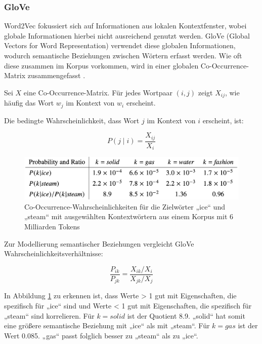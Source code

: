 \subsubsection{GloVe}

Word2Vec fokussiert sich auf Informationen aus lokalen Kontextfenster, wobei globale Informationen hierbei nicht ausreichend genutzt werden.
GloVe (Global Vectors for Word Representation) verwendet diese globalen Informationen, wodurch semantische Beziehungen zwischen Wörtern erfasst werden.
Wie oft diese zusammen im Korpus vorkommen, wird in einer globalen Co-Occurrence-Matrix zusammengefasst \cite{Wang:2020aa}.

Sei $X$ eine Co-Occurrence-Matrix.
Für jedes Wortpaar $(i, j)$ zeigt $X_{ij}$, wie häufig das Wort $w_j$ im Kontext von $w_i$ erscheint.

Die bedingte Wahrscheinlichkeit, dass Wort $j$ im Kontext von $i$ erscheint, ist:

\begin{equation}
    P(j \mid i) = \frac{X_{ij}}{X_i}
\end{equation}

\begin{figure}[htbp]
    \begin{center}
        \includegraphics[scale=0.3]{static/glove_matrix.png}
        \caption{\label{fig:glove_matrix} Co-Occurrence-Wahrscheinlichkeiten für die Zielwörter „ice“ und „steam“ mit ausgewählten Kontextwörtern aus einem Korpus mit 6 Milliarden Tokens \cite{pennington2014glove}}
    \end{center}
\end{figure}

Zur Modellierung semantischer Beziehungen vergleicht GloVe Wahrscheinlichkeitsverhältnisse:

\[
\frac{P_{ik}}{P_{jk}} = \frac{X_{ik} / X_i}{X_{jk} / X_j}
\]

In Abbildung \ref{fig:glove_matrix} zu erkennen ist, dass Werte > 1 gut mit Eigenschaften, die spezifisch für „ice“ sind
und Werte < 1 gut mit Eigenschaften, die spezifisch für „steam“ sind korrelieren.
Für $k=solid$ ist der Quotient 8.9. „solid“ hat somit eine größere semantische Beziehung mit „ice“ als mit „steam“.
Für $k=gas$ ist der Wert 0.085. „gas“ passt folglich besser zu „steam“ als zu „ice“.


